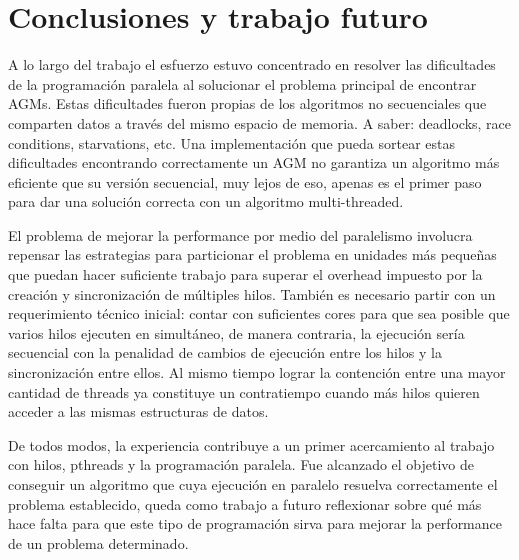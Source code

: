 \section{Conclusiones y trabajo futuro}

A lo largo del trabajo el esfuerzo estuvo concentrado en resolver las 
dificultades de la programación paralela al solucionar el problema principal 
de encontrar AGMs. Estas dificultades fueron propias de los algoritmos no 
secuenciales que comparten datos a través del mismo espacio de memoria. A 
saber: deadlocks, race conditions, starvations, etc. Una implementación que 
pueda sortear estas dificultades encontrando correctamente un AGM no garantiza
 un algoritmo más eficiente que su versión secuencial, muy lejos de eso, apenas
 es el primer paso para dar una solución correcta con un algoritmo multi-threaded.

El problema de mejorar la performance por medio del paralelismo involucra 
repensar las estrategias para particionar el problema en unidades más pequeñas 
que puedan hacer suficiente trabajo para superar el overhead impuesto por la 
creación y sincronización de múltiples hilos. También es necesario partir con 
un requerimiento técnico inicial: contar con suficientes cores para que sea 
posible que varios hilos ejecuten en simultáneo, de manera contraria, la 
ejecución sería secuencial con la penalidad de cambios de ejecución entre los 
hilos y la sincronización entre ellos. Al mismo tiempo lograr la contención
 entre una mayor cantidad de threads ya constituye un contratiempo cuando 
más hilos quieren acceder a las mismas estructuras de datos.

De todos modos, la experiencia contribuye a un primer acercamiento al trabajo 
con hilos, pthreads y la programación paralela. Fue alcanzado el objetivo de 
conseguir un algoritmo que cuya ejecución en paralelo resuelva correctamente 
el problema establecido, queda como trabajo a futuro reflexionar sobre qué 
más hace falta para que este tipo de programación sirva para mejorar la 
performance de un problema determinado.
